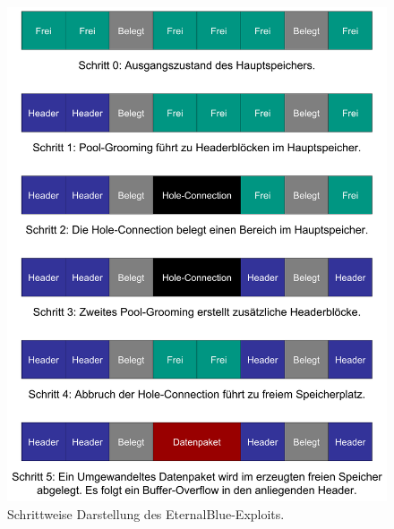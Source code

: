 \documentclass{AIFB_ITI_Crypto_Seminar}
\begin{document}
\begin{figure}
\center
  \includegraphics[width=\textwidth]{Bilder/Exploit.pdf}
  \caption{Schrittweise Darstellung des EternalBlue-Exploits.}
  \label{img:eternalblue_exploit}
\end{figure}

\clearpage
\end{document}
